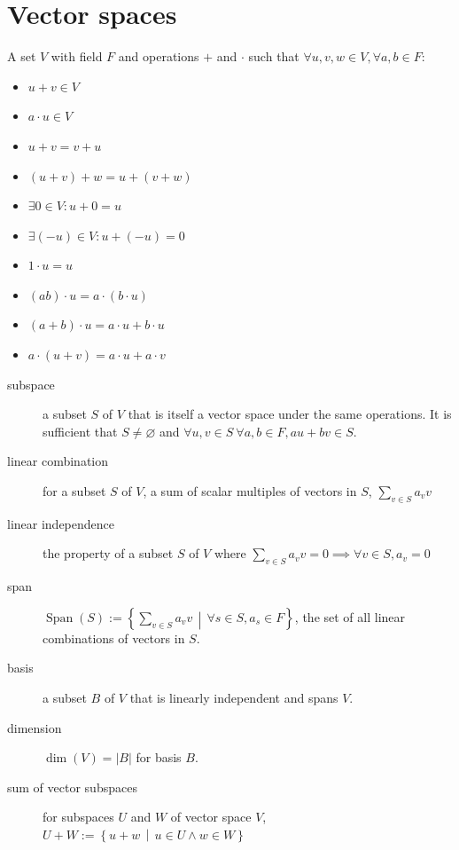 \documentclass[tbtags,columns=2]{cheatsheet}
\begin{document}
\section{Vector spaces}
A set $V$ with field $F$ and operations $+$ and $\cdot$ such that $\forall u,v,w \in V, \forall a,b \in F$:
    \begin{itemize}
        \item $u + v \in V$
        \item $a \cdot u \in V$
        \item $u + v = v + u$
        \item $(u + v) + w = u + (v + w)$
        \item $\exists 0 \in V : u + 0 = u$
        \item $\exists (-u) \in V : u + (-u) = 0$
        \item $1 \cdot u = u$
        \item $(ab) \cdot u = a \cdot (b \cdot u)$
        \item $(a + b) \cdot u = a \cdot u + b \cdot u$
        \item $a \cdot (u + v) = a \cdot u + a \cdot v$
    \end{itemize}
\begin{description}
    \item[subspace] a subset $S$ of $V$ that is itself a vector space under the same operations. It is sufficient that $S\neq\varnothing$ and $\forall u,v \in S\:\forall a,b \in F, au + bv \in S$.
    \item[linear combination] for a subset $S$ of $V$, a sum of scalar multiples of vectors in $S$, $\sum_{v\in S}a_v v$
    \item[linear independence] the property of a subset $S$ of $V$ where $\sum_{v\in S} a_v v = 0 \implies \forall v \in S, a_v = 0$
    \item[span] $\operatorname{Span}(S):= \left\{ \sum_{v \in S}a_v v \,\middle|\, \forall s \in S, a_s \in F \right\}$, the set of all linear combinations of vectors in $S$.
    \item[basis] a subset $B$ of $V$ that is linearly independent and spans $V$.
    \item[dimension] $\operatorname{dim}(V)=|B|$ for basis $B$.
    \item[sum of vector subspaces] for subspaces $U$ and $W$ of vector space $V$, $U+W := \left\{ u + w \,\middle|\, u \in U \land w \in W \right\}$
\end{description}
\end{document}
